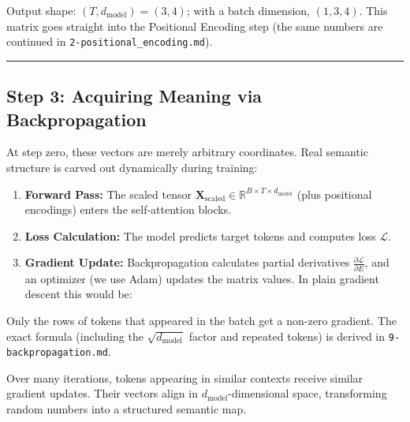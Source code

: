 \documentclass[11pt,a4paper,oneside]{report}
\providecommand{\tightlist}{\setlength{\itemsep}{0pt}\setlength{\parskip}{0pt}}
\begin{document}
Output shape: \((T, d_{\text{model}}) = (3, 4)\); with a batch dimension, \((1, 3, 4)\). This matrix goes straight into the Positional Encoding step (the same numbers are continued in \texttt{2-positional\_\allowbreak{}encoding.\allowbreak{}md}).

\begin{center}\rule{0.5\linewidth}{0.5pt}\end{center}

\subsection{Step 3: Acquiring Meaning via Backpropagation}\label{step-3-acquiring-meaning-via-backpropagation}

At step zero, these vectors are merely arbitrary coordinates. Real semantic structure is carved out dynamically during training:

\begin{enumerate}
\def\labelenumi{\arabic{enumi}.}
\tightlist
\item
  \textbf{Forward Pass:} The scaled tensor \(\mathbf{X}_{\text{scaled}} \in \mathbb{R}^{B \times T \times d_{\text{model}}}\) (plus positional encodings) enters the self-attention blocks.
\item
  \textbf{Loss Calculation:} The model predicts target tokens and computes loss \(\mathcal{L}\).
\item
  \textbf{Gradient Update:} Backpropagation calculates partial derivatives \(\frac{\partial \mathcal{L}}{\partial E}\), and an optimizer (we use Adam) updates the matrix values. In plain gradient descent this would be:
\end{enumerate}

\begin{center}\end{center}

Only the rows of tokens that appeared in the batch get a non-zero gradient. The exact formula (including the \(\sqrt{d_{\text{model}}}\) factor and repeated tokens) is derived in \texttt{9-backpropagation.\allowbreak{}md}.

Over many iterations, tokens appearing in similar contexts receive similar gradient updates. Their vectors align in \(d_{\text{model}}\)-dimensional space, transforming random numbers into a structured semantic map.
\end{document}
